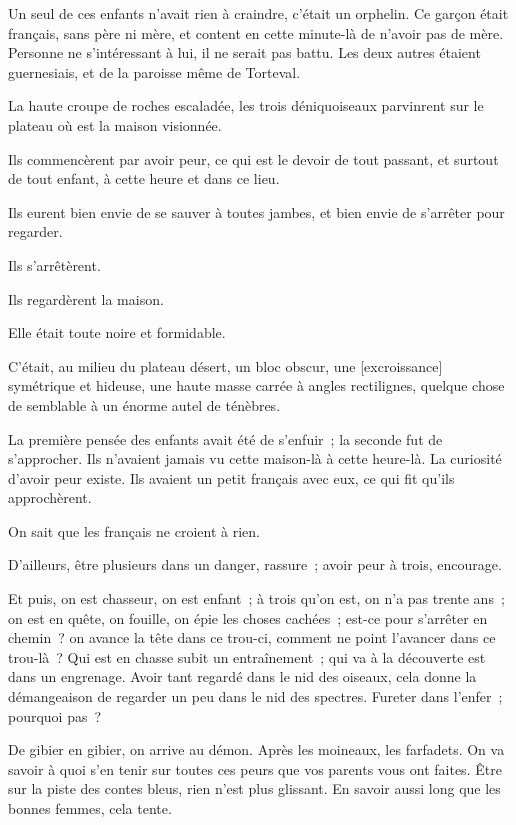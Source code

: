 \documentclass[french,twoside]{book} %
\newcommand\corr[1]{#1}
\begin{document}
Un seul de ces enfants n’avait rien à craindre, c’était un orphelin. Ce garçon était français, sans père ni mère, et content en cette minute-là de n’avoir pas de mère. Personne ne s’intéressant à lui, il ne serait  pas battu. Les deux autres étaient guernesiais, et de la paroisse même de Torteval.\par
La haute croupe de roches escaladée, les trois déniquoiseaux parvinrent sur le plateau où est la maison visionnée.\par
Ils commencèrent par avoir peur, ce qui est le devoir de tout passant, et surtout de tout enfant, à cette heure et dans ce lieu.\par
Ils eurent bien envie de se sauver à toutes jambes, et bien envie de s’arrêter pour regarder.\par
Ils s’arrêtèrent.\par
Ils regardèrent la maison.\par
Elle était toute noire et formidable.\par
C’était, au milieu du plateau désert, un bloc obscur, une [{\corr excroissance}] symétrique et hideuse, une haute masse carrée à angles rectilignes, quelque chose de semblable à un énorme autel de ténèbres.\par
La première pensée des enfants avait été de s’enfuir ; la seconde fut de s’approcher. Ils n’avaient jamais vu cette maison-là à cette heure-là. La curiosité d’avoir peur existe. Ils avaient un petit français avec eux, ce qui fit qu’ils approchèrent.\par
On sait que les français ne croient à rien.\par
D’ailleurs, être plusieurs dans un danger, rassure ; avoir peur à trois, encourage.\par
Et puis, on est chasseur, on est enfant ; à trois qu’on est, on n’a pas trente ans ; on est en quête, on fouille, on épie les choses cachées ; est-ce pour s’arrêter en chemin ? on avance la tête dans ce trou-ci, comment ne point l’avancer dans ce trou-là ? Qui est  en chasse subit un entraînement ; qui va à la découverte est dans un engrenage. Avoir tant regardé dans le nid des oiseaux, cela donne la démangeaison de regarder un peu dans le nid des spectres. Fureter dans l’enfer ; pourquoi pas ?\par
De gibier en gibier, on arrive au démon. Après les moineaux, les farfadets. On va savoir à quoi s’en tenir sur toutes ces peurs que vos parents vous ont faites. Être sur la piste des contes bleus, rien n’est plus glissant. En savoir aussi long que les bonnes femmes, cela tente.\par
\end{document}
